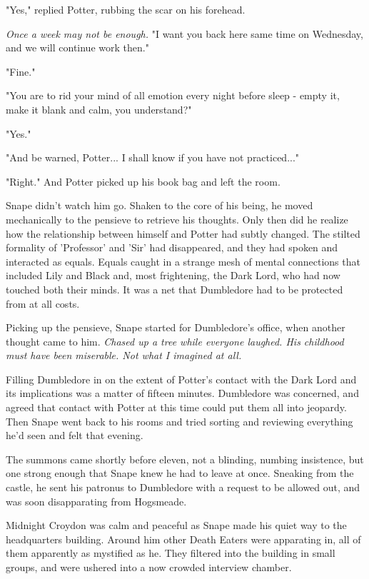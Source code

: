 \documentclass[a4paper,11pt]{article}
\begin{document}
"Yes," replied Potter, rubbing the scar on his forehead.

\emph{Once a week may not be enough.} "I want you back here same time on Wednesday, and we will continue work then."

"Fine."

"You are to rid your mind of all emotion every night before sleep - empty it, make it blank and calm, you understand?"

"Yes."

"And be warned, Potter... I shall know if you have not practiced..."

"Right." And Potter picked up his book bag and left the room.

Snape didn't watch him go. Shaken to the core of his being, he moved mechanically to the pensieve to retrieve his thoughts. Only then did he realize how the relationship between himself and Potter had subtly changed. The stilted formality of 'Professor' and 'Sir' had disappeared, and they had spoken and interacted as equals. Equals caught in a strange mesh of mental connections that included Lily and Black and, most frightening, the Dark Lord, who had now touched both their minds. It was a net that Dumbledore had to be protected from at all costs.

Picking up the pensieve, Snape started for Dumbledore's office, when another thought came to him. \emph{Chased up a tree while everyone laughed. His childhood must have been miserable. Not what I imagined at all.}

Filling Dumbledore in on the extent of Potter's contact with the Dark Lord and its implications was a matter of fifteen minutes. Dumbledore was concerned, and agreed that contact with Potter at this time could put them all into jeopardy. Then Snape went back to his rooms and tried sorting and reviewing everything he'd seen and felt that evening.

The summons came shortly before eleven, not a blinding, numbing insistence, but one strong enough that Snape knew he had to leave at once. Sneaking from the castle, he sent his patronus to Dumbledore with a request to be allowed out, and was soon disapparating from Hogsmeade.

Midnight Croydon was calm and peaceful as Snape made his quiet way to the headquarters building. Around him other Death Eaters were apparating in, all of them apparently as mystified as he. They filtered into the building in small groups, and were ushered into a now crowded interview chamber.
\end{document}
